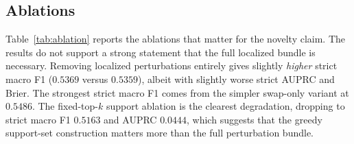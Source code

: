 \documentclass{article}
\begin{document}
\begin{table}[t]
\caption{Executed comparison from \texttt{exp/*/results.json}. Best value in each column is in \textbf{bold}. Higher is better for macro F1, AUPRC, and AUROC; lower is better for Brier.}
\label{tab:main}
\centering
\small
{}
\end{table}

\subsection{Ablations}
Table~\ref{tab:ablation} reports the ablations that matter for the novelty claim. The results do not support a strong statement that the full localized bundle is necessary. Removing localized perturbations entirely gives slightly \emph{higher} strict macro F1 ($0.5369$ versus $0.5359$), albeit with slightly worse strict AUPRC and Brier. The strongest strict macro F1 comes from the simpler swap-only variant at $0.5486$. The fixed-top-$k$ support ablation is the clearest degradation, dropping to strict macro F1 $0.5163$ and AUPRC $0.0444$, which suggests that the greedy support-set construction matters more than the full perturbation bundle.
\end{document}
